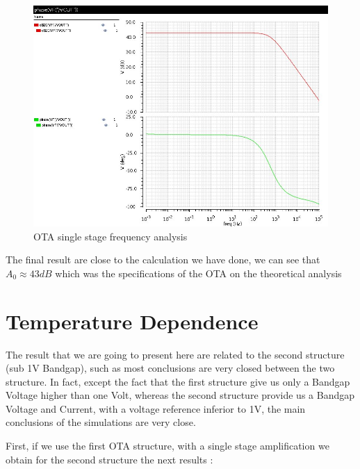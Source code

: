 \documentclass[11pt,a4paper]{report}
\begin{document}
\begin{figure}[h]
  \begin{center}
    \includegraphics[scale=0.6]{photo/OTA_freq_gain}
  \end{center}
  \caption{OTA single stage frequency analysis}
\end{figure}

The final result are close to the calculation we have done, we can see that $A_0 \approx 43 dB$ which was the specifications of the OTA on the theoretical analysis 

\section{Temperature Dependence}

The result that we are going to present here are related to the second structure (sub 1V Bandgap), such as most conclusions are very closed between the two structure.
In fact, except the fact that the first structure give us only a Bandgap Voltage higher than one Volt, whereas the second structure provide us a Bandgap Voltage and Current, with a voltage reference inferior to 1V, the main conclusions of the simulations are very close.

First, if we use the first OTA structure, with a single stage amplification we obtain for the second structure the next results :
\end{document}
